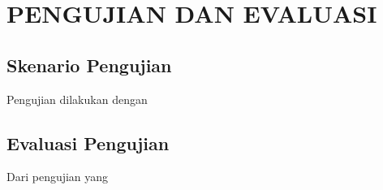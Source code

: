 \chapter{PENGUJIAN DAN EVALUASI}
\vspace{4ex}

\setlength{\parindent}{7ex}

\section{Skenario Pengujian}
\vspace{1ex}

Pengujian dilakukan dengan \lipsum[1]
\vspace{0.5ex}

\lipsum[2]
\vspace{0.5ex}

\newpage

\section{Evaluasi Pengujian}
\vspace{1ex}

Dari pengujian yang \lipsum[3]
\vspace{0.5ex}

\lipsum[4]
\vspace{0.5ex}